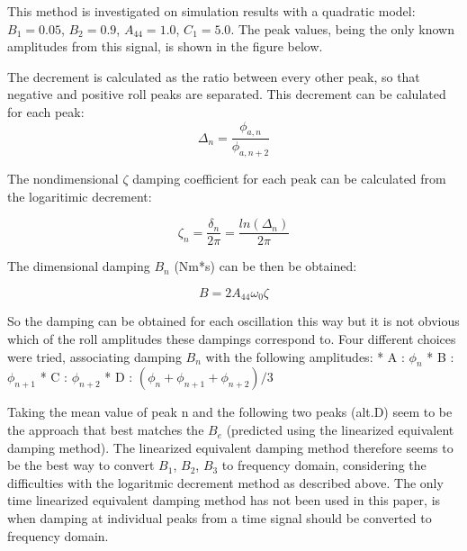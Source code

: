This method is investigated on simulation results with a quadratic
model: \(B_1 = 0.05\), \(B_2 = 0.9\), \(A_{44} = 1.0\), \(C_1 = 5.0\).
The peak values, being the only known amplitudes from this signal, is
shown in the figure below.

    \begin{figure}
        \begin{center}\end{center}
        \caption{}
        \label{fig:}
    \end{figure}
    
    The decrement is calculated as the ratio between every other peak, so
that negative and positive roll peaks are separated. This decrement can
be calulated for each peak:
\[ \Delta_n = \frac{\phi_{a,n}}{\phi_{a,n+2}}\]

    The nondimensional \(\zeta\) damping coefficient for each peak can be
calculated from the logaritimic decrement:

    \[\zeta_n = \frac{\delta_n}{2\pi}=\frac{ln(\Delta_n)}{2\pi}\]

    The dimensional damping \(B_n\) (Nm*s) can be then be obtained:
 
            
    
    \begin{equation}
B = 2 A_{44} \omega_{0} \zeta
\label{eq:equation}
\end{equation}

    

    So the damping can be obtained for each oscillation this way but it is
not obvious which of the roll amplitudes these dampings correspond to.
Four different choices were tried, associating damping \(B_n\) with the
following amplitudes: * A : \(\phi_n\) * B : \(\phi_{n+1}\) * C :
\(\phi_{n+2}\) * D : \((\phi_n + \phi_{n+1} + \phi_{n+2})/3\)

    \begin{figure}
        \begin{center}\end{center}
        \caption{}
        \label{fig:}
    \end{figure}
    
    Taking the mean value of peak n and the following two peaks (alt.D) seem
to be the approach that best matches the \(B_e\) (predicted using the
linearized equivalent damping method). The linearized equivalent damping
method therefore seems to be the best way to convert \(B_1\), \(B_2\),
\(B_3\) to frequency domain, considering the difficulties with the
logaritmic decrement method as described above. The only time linearized
equivalent damping method has not been used in this paper, is when
damping at individual peaks from a time signal should be converted to
frequency domain.

